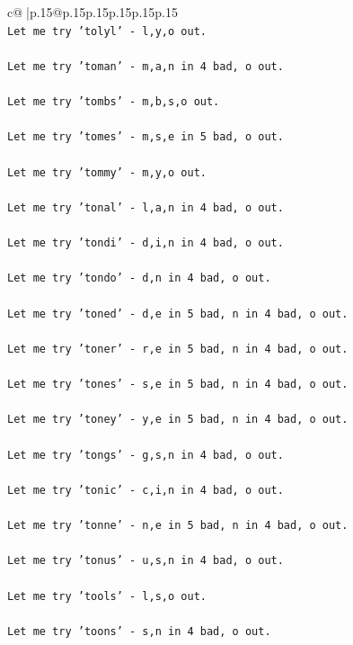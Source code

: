 \documentclass{article}
\begin{document}
{\begin{supertabular}{c@{$\;$}|p{.15\linewidth}@{}p{.15\linewidth}p{.15\linewidth}p{.15\linewidth}p{.15\linewidth}p{.15\linewidth}}
{{{\\ 
\texttt{Let me try 'tolyl' {-} l,y,o out. } \\
\\ 
\texttt{Let me try 'toman' {-} m,a,n in 4 bad, o out. } \\
\\ 
\texttt{Let me try 'tombs' {-} m,b,s,o out. } \\
\\ 
\texttt{Let me try 'tomes' {-} m,s,e in 5 bad, o out. } \\
\\ 
\texttt{Let me try 'tommy' {-} m,y,o out. } \\
\\ 
\texttt{Let me try 'tonal' {-} l,a,n in 4 bad, o out. } \\
\\ 
\texttt{Let me try 'tondi' {-} d,i,n in 4 bad, o out. } \\
\\ 
\texttt{Let me try 'tondo' {-} d,n in 4 bad, o out. } \\
\\ 
\texttt{Let me try 'toned' {-} d,e in 5 bad, n in 4 bad, o out. } \\
\\ 
\texttt{Let me try 'toner' {-} r,e in 5 bad, n in 4 bad, o out. } \\
\\ 
\texttt{Let me try 'tones' {-} s,e in 5 bad, n in 4 bad, o out. } \\
\\ 
\texttt{Let me try 'toney' {-} y,e in 5 bad, n in 4 bad, o out. } \\
\\ 
\texttt{Let me try 'tongs' {-} g,s,n in 4 bad, o out. } \\
\\ 
\texttt{Let me try 'tonic' {-} c,i,n in 4 bad, o out. } \\
\\ 
\texttt{Let me try 'tonne' {-} n,e in 5 bad, n in 4 bad, o out. } \\
\\ 
\texttt{Let me try 'tonus' {-} u,s,n in 4 bad, o out. } \\
\\ 
\texttt{Let me try 'tools' {-} l,s,o out. } \\
\\ 
\texttt{Let me try 'toons' {-} s,n in 4 bad, o out. } \\
\\ 
}}}
\end{supertabular}}
\end{document}
